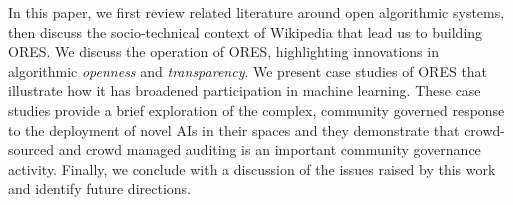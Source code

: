 In this paper, we first review related literature around open algorithmic systems, then discuss the socio-technical context of Wikipedia that lead us to building ORES. We discuss the operation of ORES, highlighting innovations in algorithmic \emph{openness} and \emph{transparency}. We present case studies of ORES that illustrate how it has broadened participation in machine learning.  These case studies provide a brief exploration of the complex, community governed response to the deployment of novel AIs in their spaces and they demonstrate that crowd-sourced and crowd managed auditing is an important community governance activity.  Finally, we conclude with a discussion of the issues raised by this work and identify future directions.
